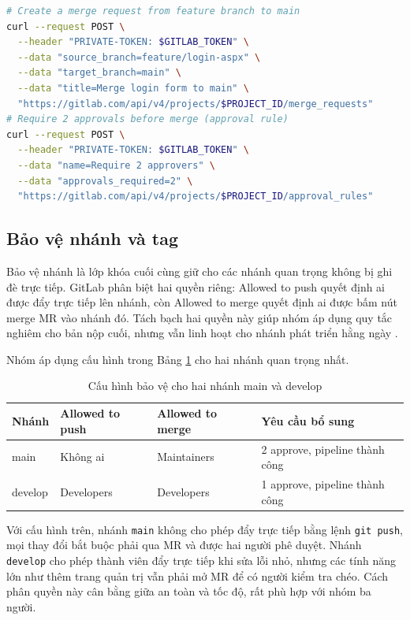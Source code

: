 \begin{lstlisting}[language=bash, caption={Tạo Merge Request và Approval rule bằng API}, label={lst:c51-mr-approve}]
# Create a merge request from feature branch to main
curl --request POST \
  --header "PRIVATE-TOKEN: $GITLAB_TOKEN" \
  --data "source_branch=feature/login-aspx" \
  --data "target_branch=main" \
  --data "title=Merge login form to main" \
  "https://gitlab.com/api/v4/projects/$PROJECT_ID/merge_requests"
# Require 2 approvals before merge (approval rule)
curl --request POST \
  --header "PRIVATE-TOKEN: $GITLAB_TOKEN" \
  --data "name=Require 2 approvers" \
  --data "approvals_required=2" \
  "https://gitlab.com/api/v4/projects/$PROJECT_ID/approval_rules"
\end{lstlisting}

\subsection{Bảo vệ nhánh và tag}
\label{subsec:c51-bao-ve-nhanh}

Bảo vệ nhánh là lớp khóa cuối cùng giữ cho các nhánh quan trọng không bị ghi đè trực tiếp.
GitLab phân biệt hai quyền riêng: Allowed to push quyết định ai được đẩy trực tiếp lên nhánh,
còn Allowed to merge quyết định ai được bấm nút merge MR vào nhánh đó.
Tách bạch hai quyền này giúp nhóm áp dụng quy tắc nghiêm cho bản nộp cuối,
nhưng vẫn linh hoạt cho nhánh phát triển hằng ngày \cite{gitlabdocs}.

Nhóm áp dụng cấu hình trong Bảng \ref{tab:c51-protected} cho hai nhánh quan trọng nhất.

\begin{table}[H]
\centering
\caption{Cấu hình bảo vệ cho hai nhánh main và develop}
\label{tab:c51-protected}
\begin{tabular}{llll}
\toprule
Nhánh & Allowed to push & Allowed to merge & Yêu cầu bổ sung \\
\midrule
main & Không ai & Maintainers & 2 approve, pipeline thành công \\
develop & Developers & Developers & 1 approve, pipeline thành công \\
\bottomrule
\end{tabular}
\end{table}

Với cấu hình trên, nhánh \texttt{main} không cho phép đẩy trực tiếp bằng lệnh \verb|git push|,
mọi thay đổi bắt buộc phải qua MR và được hai người phê duyệt.
Nhánh \texttt{develop} cho phép thành viên đẩy trực tiếp khi sửa lỗi nhỏ,
nhưng các tính năng lớn như thêm trang quản trị vẫn phải mở MR để có người kiểm tra chéo.
Cách phân quyền này cân bằng giữa an toàn và tốc độ, rất phù hợp với nhóm ba người.

